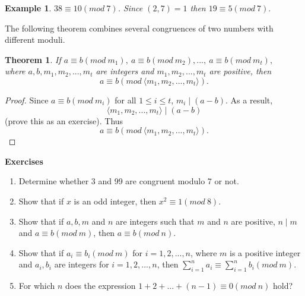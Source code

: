 \documentclass[12pt,letterpaper]{book}
\newtheorem{theorem}{Theorem}
\newtheorem{example}{Example}
\begin{document}
\begin{example}
$38 \equiv 10 (mod\ 7)$.  Since $(2,7)=1$ then $19\equiv 5 (mod \
7).$
\end{example}

The following theorem combines several congruences of two numbers
with different moduli.

\begin{theorem}\label{conglcm}
If
$a\equiv b(mod \ m_1),~a\equiv b(mod \ m_2),...,~a\equiv b(mod \ m_t),$\\
where $a,b,m_1,m_2,...,m_t$ are integers and $m_1,m_2,...,m_t$ are
positive, then
\begin{equation*}
a\equiv b(mod \ \langle m_1,m_2,...,m_t\rangle).
\end{equation*}
\end{theorem}

\begin{proof}
Since $a\equiv b (mod \ m_i)$ for all $1\leq i\leq t$, $m_i
\mid (a-b)$.  As a result,
\begin{equation*}
\langle m_1,m_2,...,m_t\rangle \mid (a-b)
\end{equation*}
(prove this as an exercise).  Thus
\begin{equation*}
a\equiv b(mod \ \langle m_1,m_2,...,m_t\rangle). \end{equation*}
\end{proof}

\textbf{Exercises}
\begin{enumerate}
\item{Determine whether 3 and 99 are congruent modulo 7 or not.}
\item{Show that if $x$ is an odd integer, then $x^2\equiv 1(mod \
8)$.} \item{Show that if $a,b, m$ and $n$ are integers such that $m$
and $n$ are positive, $n \mid m$ and $a\equiv b (mod \ m)$, then
$a\equiv b (mod \ n).$}\item{Show that if $a_i\equiv b_i(mod \ m)$
for $i=1,2,...,n$, where $m$ is a positive integer and $a_i,b_i$ are
integers for $i=1,2,...,n$, then $\sum_{i=1}^na_i\equiv
\sum_{i=1}^nb_i(mod \ m)$.}\item{For which $n$ does the expression
$1+2+...+(n-1)\equiv 0(mod \ n)$ hold?}

\end{enumerate}

\newpage
\end{document}
